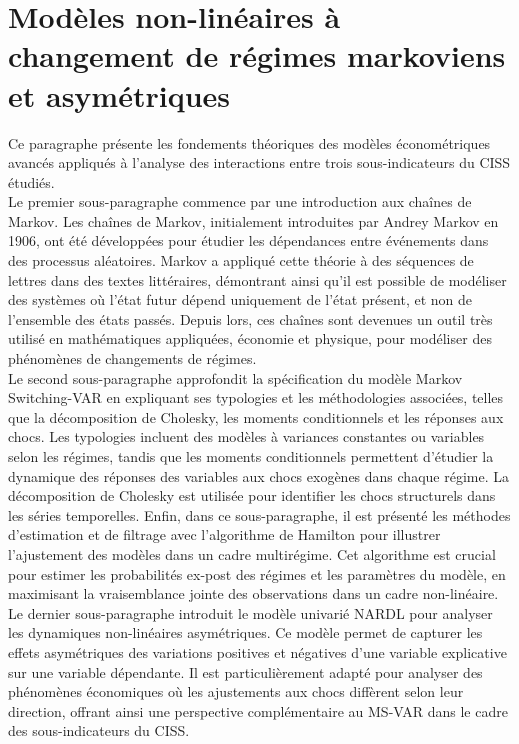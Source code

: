 \section{Modèles non-linéaires à changement de régimes markoviens et asymétriques}

\begin{sloppypar}
Ce paragraphe présente les fondements théoriques des modèles économétriques avancés appliqués à l’analyse des interactions entre trois sous-indicateurs du CISS étudiés.\\

Le premier sous-paragraphe commence par une introduction aux chaînes de Markov. Les chaînes de Markov, initialement introduites par Andrey Markov en 1906, ont été développées pour étudier les dépendances entre événements dans des processus aléatoires. Markov a appliqué cette théorie à des séquences de lettres dans des textes littéraires, démontrant ainsi qu'il est possible de modéliser des systèmes où l'état futur dépend uniquement de l'état présent, et non de l'ensemble des états passés. Depuis lors, ces chaînes sont devenues un outil très utilisé en mathématiques appliquées, économie et physique, pour modéliser des phénomènes de changements de régimes.\\

Le second sous-paragraphe approfondit la spécification du modèle Markov Switching-VAR en expliquant ses typologies et les méthodologies associées, telles que la décomposition de Cholesky, les moments conditionnels et les réponses aux chocs. Les typologies incluent des modèles à variances constantes ou variables selon les régimes, tandis que les moments conditionnels permettent d’étudier la dynamique des réponses des variables aux chocs exogènes dans chaque régime. La décomposition de Cholesky est utilisée pour identifier les chocs structurels dans les séries temporelles.
Enfin, dans ce sous-paragraphe, il est présenté les méthodes d'estimation et de filtrage avec l'algorithme de Hamilton pour illustrer l’ajustement des modèles dans un cadre multirégime. Cet algorithme est crucial pour estimer les probabilités ex-post des régimes et les paramètres du modèle, en maximisant la vraisemblance jointe des observations dans un cadre non-linéaire.\\

Le dernier sous-paragraphe introduit le modèle univarié NARDL pour analyser les dynamiques non-linéaires asymétriques. Ce modèle permet de capturer les effets asymétriques des variations positives et négatives d’une variable explicative sur une variable dépendante. Il est particulièrement adapté pour analyser des phénomènes économiques où les ajustements aux chocs diffèrent selon leur direction, offrant ainsi une perspective complémentaire au MS-VAR dans le cadre des sous-indicateurs du CISS.


\end{sloppypar}
